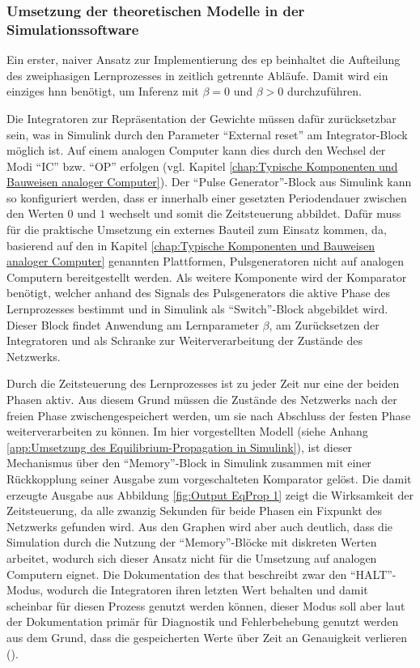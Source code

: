 \subsubsection{Umsetzung der theoretischen Modelle in der Simulationssoftware}
\label{chap:Umsetzung der theoretischen Modelle in der Simulationssoftware}

Ein erster, naiver Ansatz zur Implementierung des \ac{ep} beinhaltet die Aufteilung des zweiphasigen Lernprozesses in zeitlich getrennte Abläufe. Damit wird ein einziges \ac{hnn} benötigt, um Inferenz mit \(\beta=0\) und \(\beta>0\) durchzuführen.

Die Integratoren zur Repräsentation der Gewichte müssen dafür zurücksetzbar sein, was in Simulink durch den Parameter "`External reset"' am Integrator-Block möglich ist. Auf einem analogen Computer kann dies durch den Wechsel der Modi "`IC"' bzw. "`OP"' erfolgen (vgl. Kapitel \ref{chap:Typische Komponenten und Bauweisen analoger Computer}). Der "`Pulse Generator"'-Block aus Simulink kann so konfiguriert werden, dass er innerhalb einer gesetzten Periodendauer zwischen den Werten \(0\) und \(1\) wechselt und somit die Zeitsteuerung abbildet. Dafür muss für die praktische Umsetzung ein externes Bauteil zum Einsatz kommen, da, basierend auf den in Kapitel \ref{chap:Typische Komponenten und Bauweisen analoger Computer} genannten Plattformen, Pulsgeneratoren nicht auf analogen Computern bereitgestellt werden. Als weitere Komponente wird der Komparator benötigt, welcher anhand des Signals des Pulsgenerators die aktive Phase des Lernprozesses bestimmt und in Simulink als "`Switch"'-Block abgebildet wird. Dieser Block findet Anwendung am Lernparameter \(\beta\), am Zurücksetzen der Integratoren und als Schranke zur Weiterverarbeitung der Zustände des Netzwerks.

Durch die Zeitsteuerung des Lernprozesses ist zu jeder Zeit nur eine der beiden Phasen aktiv. Aus diesem Grund müssen die Zustände des Netzwerks nach der freien Phase zwischengespeichert werden, um sie nach Abschluss der festen Phase weiterverarbeiten zu können. Im hier vorgestellten Modell (siehe Anhang \ref{app:Umsetzung des Equilibrium-Propagation in Simulink}), ist dieser Mechanismus über den "`Memory"'-Block in Simulink zusammen mit einer Rückkopplung seiner Ausgabe zum vorgeschalteten Komparator gelöst. Die damit erzeugte Ausgabe aus Abbildung \ref{fig:Output EqProp 1} zeigt die Wirksamkeit der Zeitsteuerung, da alle zwanzig Sekunden für beide Phasen ein Fixpunkt des Netzwerks gefunden wird. Aus den Graphen wird aber auch deutlich, dass die Simulation durch die Nutzung der "`Memory"'-Blöcke mit diskreten Werten arbeitet, wodurch sich dieser Ansatz nicht für die Umsetzung auf analogen Computern eignet. Die Dokumentation des \ac{that} beschreibt zwar den "`HALT"'-Modus, wodurch die Integratoren ihren letzten Wert behalten und damit scheinbar für diesen Prozess genutzt werden können, dieser Modus soll aber laut der Dokumentation primär für Diagnostik und Fehlerbehebung genutzt werden \ua aus dem Grund, dass die gespeicherten Werte über Zeit an Genauigkeit verlieren (\cite[vgl.]{website:anabrid:that-docs}).

